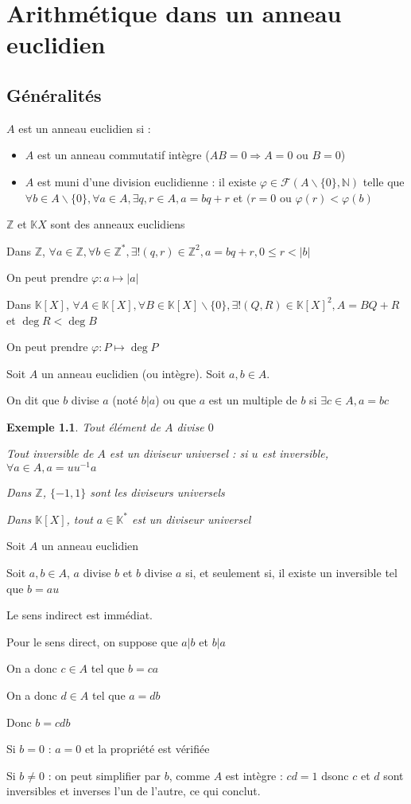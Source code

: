 \documentclass[a4paper,12pt]{book}
\newcommand{\Def}[2]{\begin{tcolorbox}[sharp corners, colback=white,colframe=blue!90!black!75, title=Définition : #1]#2\end{tcolorbox}}
\newcommand{\Prop}[2]{\begin{tcolorbox}[sharp corners, colback=white,colframe=red!90!black!75, title=Proposition : #1]#2\end{tcolorbox}}
\newcommand{\Pre}[1]{\begin{tcolorbox}[sharp corners, colback=white,colframe=green!60!green!30!black!75, title=Preuve]#1\end{tcolorbox}}
\newtheorem{Exe}{Exemple}[section]
\def\N{\mathbb{N}}
\def\Z{\mathbb{Z}}
\def\K{\mathbb{K}}
\begin{document}
\chapter{Arithmétique dans un anneau euclidien}
\section{Généralités}
\Def{Anneau euclidien}{$A$ est un anneau euclidien si :\begin{itemize}
\item $A$ est un anneau commutatif intègre ($AB=0 \Rightarrow A=0\text{ ou } B=0$)
\item $A$ est muni d'une division euclidienne : il existe $\varphi\in\mathcal{F}(A\backslash\{0\},\N)$ telle que $\forall b\in A\backslash\{0\}, \forall a\in A, \exists q,r\in A, a =bq+r$ et $(r=0\text{ ou }\varphi(r)<\varphi(b)$
\end{itemize}}
$\Z$ et $\K{X}$ sont des anneaux euclidiens
\par Dans $\Z$, $\forall a\in \Z, \forall b\in \Z^*, \exists!(q,r)\in\Z^2, a =bq+r, 0\leq r<\vert b\vert$ \par On peut prendre $\varphi:a\mapsto \vert a\vert$
\par Dans $\K[X]$, $\forall A\in\K[X], \forall B\in\K[X]\backslash\{0\}, \exists !(Q,R)\in\K[X]^2, A=BQ+R$ et $\deg R<\deg B$ \par On peut prendre $\varphi:P\mapsto \deg P$
\Def{Divisibilité}{Soit $A$ un anneau euclidien (ou intègre). Soit $a,b\in A$. \par On dit que $b$ divise $a$ (noté $b|a$) ou que $a$ est un multiple de $b$ si $\exists c\in A, a = bc$}
\begin{Exe}
Tout élément de $A$ divise $0$
\par Tout inversible de $A$ est un diviseur universel : si $u$ est inversible, $\forall a\in A, a = uu^{-1}a$ \par Dans $\Z$, $\{-1,1\}$ sont les diviseurs universels \par Dans $\K[X]$, tout $a\in\K^*$ est un diviseur universel
\end{Exe}
\Prop{Association}{Soit $A$ un anneau euclidien \par Soit $a,b\in A$, $a$ divise $b$ et $b$ divise $a$ si, et seulement si, il existe un inversible tel que $b = au$}
\Pre{Le sens indirect est immédiat.
\par Pour le sens direct, on suppose que $a|b$ et $b|a$ \par On a donc $c\in A$ tel que $b=ca$ \par On a donc $d\in A$ tel que $a =db$ \par Donc $b=cdb$ \par Si $b=0$ : $a=0$ et la propriété est vérifiée \par Si $b\neq 0$ : on peut simplifier par $b$, comme $A$ est intègre : $cd=1$ dsonc $c$ et $d$ sont inversibles et inverses l'un de l'autre, ce qui conclut.}
\end{document}
